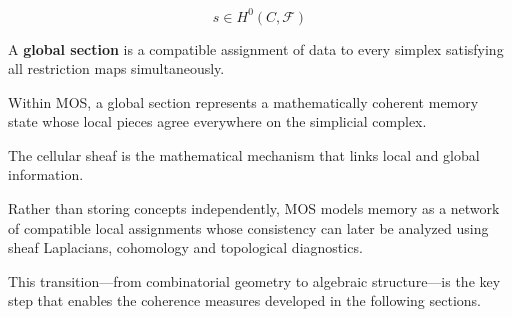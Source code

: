 
\begin{eqbox}

\[
\boxed{
s\in H^{0}(C,\mathcal F)
}
\]

\BodyFont

A \textbf{global section} is a compatible assignment of data to every
simplex satisfying all restriction maps simultaneously.

Within MOS, a global section represents a mathematically coherent memory
state whose local pieces agree everywhere on the simplicial complex.

\end{eqbox}


\begin{remarkbox}

\BodyFont

The cellular sheaf is the mathematical mechanism that links local and
global information.

Rather than storing concepts independently, MOS models memory as a network
of compatible local assignments whose consistency can later be analyzed
using sheaf Laplacians, cohomology and topological diagnostics.

This transition—from combinatorial geometry to algebraic structure—is the
key step that enables the coherence measures developed in the following
sections.

\end{remarkbox}